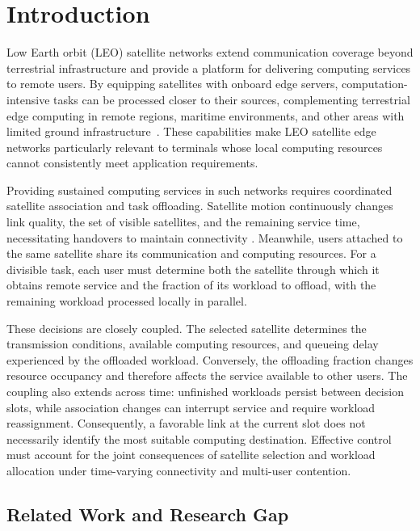 \documentclass[journal]{IEEEtran}
\begin{document}
\section{Introduction}
\label{sec:introduction}

Low Earth orbit (LEO) satellite networks extend communication
coverage beyond terrestrial infrastructure and provide a
platform for delivering computing services to remote users.
By equipping satellites with onboard edge servers,
computation-intensive tasks can be processed closer to their
sources, complementing terrestrial edge computing in remote
regions, maritime environments, and other areas with limited
ground infrastructure~\cite{wang2023satellitecomputing}.
These capabilities make LEO satellite edge networks
particularly relevant to terminals whose local computing
resources cannot consistently meet application requirements.

Providing sustained computing services in such networks
requires coordinated satellite association and task offloading.
Satellite motion continuously changes link quality, the set
of visible satellites, and the remaining service time,
necessitating handovers to maintain connectivity
\cite{wang2023seamless}.
Meanwhile, users attached to the same satellite share
its communication and computing resources.
For a divisible task, each user must determine both the
satellite through which it obtains remote service and the
fraction of its workload to offload, with the remaining
workload processed locally in parallel.

These decisions are closely coupled.
The selected satellite determines the transmission conditions,
available computing resources, and queueing delay experienced
by the offloaded workload.
Conversely, the offloading fraction changes resource
occupancy and therefore affects the service available to
other users.
The coupling also extends across time: unfinished workloads
persist between decision slots, while association changes
can interrupt service and require workload reassignment.
Consequently, a favorable link at the current slot does not
necessarily identify the most suitable computing destination.
Effective control must account for the joint consequences
of satellite selection and workload allocation under
time-varying connectivity and multi-user contention.

\subsection{Related Work and Research Gap}
\end{document}
